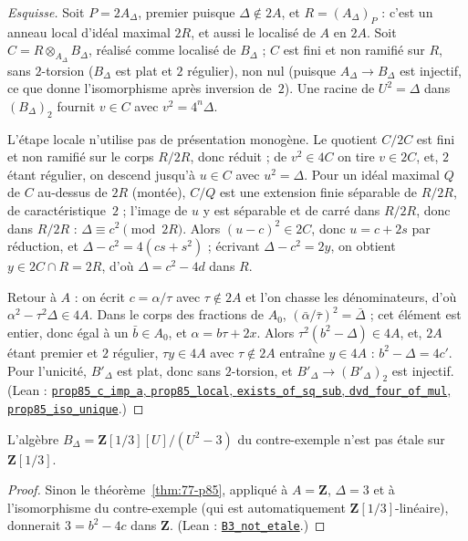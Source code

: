 \begin{proof}[Esquisse]
Soit $P = 2A_\Delta$, premier puisque $\Delta \notin 2A$, et $R = (A_\Delta)_P$ : c'est un anneau local d'idéal maximal $2R$, et aussi le localisé de $A$ en $2A$. Soit $C = R \otimes_{A_\Delta} B_\Delta$, réalisé comme localisé de $B_\Delta$ ; $C$ est fini et non ramifié sur $R$, sans $2$-torsion ($B_\Delta$ est plat et $2$ régulier), non nul (puisque $A_\Delta \to B_\Delta$ est injectif, ce que donne l'isomorphisme après inversion de~$2$). Une racine de $U^2 = \Delta$ dans $(B_\Delta)_2$ fournit $v \in C$ avec $v^2 = 4^n\Delta$.

L'étape locale n'utilise pas de présentation monogène. Le quotient $C/2C$ est fini et non ramifié sur le corps $R/2R$, donc réduit ; de $v^2 \in 4C$ on tire $v \in 2C$, et, $2$ étant régulier, on descend jusqu'à $u \in C$ avec $u^2 = \Delta$. Pour un idéal maximal $Q$ de $C$ au-dessus de $2R$ (montée), $C/Q$ est une extension finie séparable de $R/2R$, de caractéristique~$2$ ; l'image de $u$ y est séparable et de carré dans $R/2R$, donc dans $R/2R$ : $\Delta \equiv c^2 \pmod{2R}$. Alors $(u - c)^2 \in 2C$, donc $u = c + 2s$ par réduction, et $\Delta - c^2 = 4(cs + s^2)$ ; écrivant $\Delta - c^2 = 2y$, on obtient $y \in 2C \cap R = 2R$, d'où $\Delta = c^2 - 4d$ dans $R$.

Retour à $A$ : on écrit $c = \alpha/\tau$ avec $\tau \notin 2A$ et l'on chasse les dénominateurs, d'où $\alpha^2 - \tau^2\Delta \in 4A$. Dans le corps des fractions de $A_0$, $(\bar\alpha/\bar\tau)^2 = \bar\Delta$ ; cet élément est entier, donc égal à un $\bar b \in A_0$, et $\alpha = b\tau + 2x$. Alors $\tau^2(b^2 - \Delta) \in 4A$, et, $2A$ étant premier et $2$ régulier, $\tau y \in 4A$ avec $\tau \notin 2A$ entraîne $y \in 4A$ : $b^2 - \Delta = 4c'$. Pour l'unicité, $B'_\Delta$ est plat, donc sans $2$-torsion, et $B'_\Delta \to (B'_\Delta)_2$ est injectif. (Lean : \href{\leanblob/RingTheory/Folder77.lean}{\texttt{prop85\_c\_imp\_a}, \texttt{prop85\_local}, \texttt{exists\_of\_sq\_sub}, \texttt{dvd\_four\_of\_mul}, \texttt{prop85\_iso\_unique}}.)
\end{proof}

\begin{corollaire}\label{cor:77-B3}
L'algèbre $B_\Delta = \mathbf Z[1/3][U]/(U^2 - 3)$ du contre-exemple n'est pas étale sur $\mathbf Z[1/3]$.
\end{corollaire}

\begin{proof}
Sinon le théorème~\ref{thm:77-p85}, appliqué à $A = \mathbf Z$, $\Delta = 3$ et à l'isomorphisme du contre-exemple (qui est automatiquement $\mathbf Z[1/3]$-linéaire), donnerait $3 = b^2 - 4c$ dans $\mathbf Z$. (Lean : \href{\leanblob/RingTheory/Folder77.lean}{\texttt{B3\_not\_etale}}.)
\end{proof}

